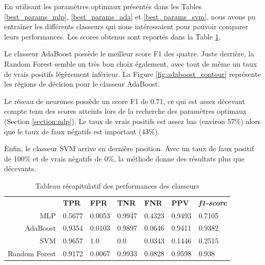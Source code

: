 \documentclass[a4paper]{report}
\begin{document}
En utilisant les paramètres optimaux présentés dans les Tables \ref{best_params_mlp}, \ref{best_params_ada} et \ref{best_params_svm}, nous avons pu entraîner les différents classeurs qui nous intéressaient pour pouvoir comparer leurs performances. Les scores obtenus sont reportés dans la Table \ref{table:scores}.

Le classeur AdaBoost possède le meilleur score F1 des quatre. Juste derrière, la Random Forest semble un très bon choix également, avec tout de même un taux de vrais positifs légèrement inférieur. La Figure \ref{fig:adaboost_contour} représente les régions de décision pour le classeur AdaBoost.

Le réseau de neurones possède un score F1 de 0.71, ce qui est assez décevant compte tenu des scores atteints lors de la recherche des paramètres optimaux (Section \ref{section:mlp}). Le taux de vrais positifs est assez bas (environ 57\%) alors que le taux de faux négatifs est important (43\%).

Enfin, le classeur SVM arrive en dernière position. Avec un taux de faux positif de 100\% et de vrais négatifs de 0\%, la méthode donne des résultats plus que décevants. 

\begin{table}
\centering
\begin{tabular}{r | llllll}
& \textbf{TPR} & \textbf{FPR} & \textbf{TNR} & \textbf{FNR} & \textbf{PPV} & \textbf{\emph{f1-score}} \\
MLP & 0.5677 & 0.0053 & 0.9947 & 0.4323 & 0.9493 & 0.7105 \\
AdaBoost & 0.9354 & 0.0103 & 0.9897 & 0.0646 & 0.9411 & 0.9382 \\
SVM & 0.9657 & 1.0 & 0.0 & 0.0343 & 0.1446 & 0.2515 \\
Random Forest & 0.9172 & 0.0067 & 0.9933 & 0.0828 & 0.9598 & 0.938 \\
\end{tabular}
\caption{Tableau récapitulatif des performances des classeurs\label{table:scores}}
\end{table}
\end{document}
